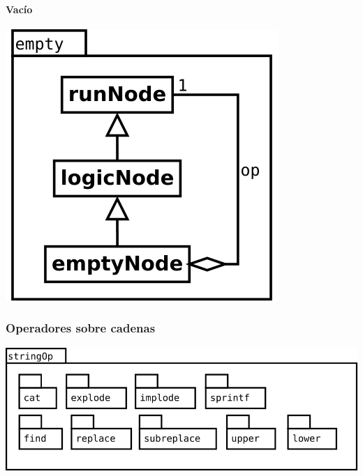 \paragraph {Vacío}
\begin{center}
\includegraphics[scale=0.4]{empty.png} \\
\end{center}


\pagebreak
\subsubsection {Operadores sobre cadenas}
\begin{center}
\includegraphics[scale=0.4]{stringOp-package.png} \\
\end{center}

